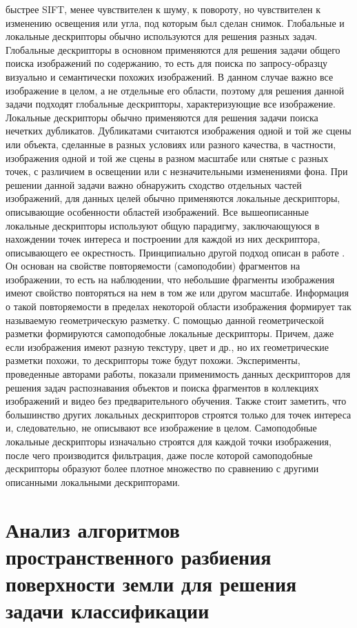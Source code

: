 быстрее SIFT, менее чувствителен к шуму, к повороту, но чувствителен к изменению
освещения или угла, под которым был сделан снимок.
Глобальные и локальные дескрипторы обычно используются для решения разных
задач. Глобальные дескрипторы в основном применяются для решения задачи общего
поиска изображений по содержанию, то есть для поиска по запросу-образцу визуально и
семантически похожих изображений. В данном случае важно все изображение в целом, а
не отдельные его области, поэтому для решения данной задачи подходят глобальные
дескрипторы, характеризующие все изображение. Локальные дескрипторы обычно
применяются для решения задачи поиска нечетких дубликатов. Дубликатами считаются 
изображения одной и той же сцены или объекта, сделанные в разных условиях или
разного качества, в частности, изображения одной и той же сцены в разном масштабе или
снятые с разных точек, с различием в освещении или с незначительными изменениями
фона. При решении данной задачи важно обнаружить сходство отдельных частей
изображений, для данных целей обычно применяются локальные дескрипторы,
описывающие особенности областей изображений.
Все вышеописанные локальные дескрипторы используют общую парадигму,
заключающуюся в нахождении точек интереса и построении для каждой из них
дескриптора, описывающего ее окрестность. Принципиально другой подход описан в
работе \cite{localselfsim}. Он основан на свойстве повторяемости (самоподобии) фрагментов на
изображении, то есть на наблюдении, что небольшие фрагменты изображения имеют
свойство повторяться на нем в том же или другом масштабе. Информация о такой
повторяемости в пределах некоторой области изображения формирует так называемую
геометрическую разметку. С помощью данной геометрической разметки формируются
самоподобные локальные дескрипторы. Причем, даже если изображения имеют разную
текстуру, цвет и др., но их геометрические разметки похожи, то дескрипторы тоже будут
похожи. Эксперименты, проведенные авторами работы, показали применимость данных
дескрипторов для решения задач распознавания объектов и поиска фрагментов в
коллекциях изображений и видео без предварительного обучения. Также стоит заметить,
что большинство других локальных дескрипторов строятся только для точек интереса и,
следовательно, не описывают все изображение в целом. Самоподобные локальные
дескрипторы изначально строятся для каждой точки изображения, после чего
производится фильтрация, даже после которой самоподобные дескрипторы образуют
более плотное множество по сравнению с другими описанными локальными
дескрипторами.

\section{Анализ алгоритмов пространственного разбиения поверхности земли для решения задачи классификации }

